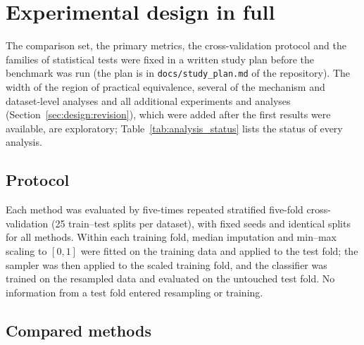 \section{Experimental design in full}\label{sec:design}

The comparison set, the primary metrics, the cross-validation protocol and the families of statistical tests were fixed in a written study plan before the benchmark was run (the plan is in \texttt{docs/study\_plan.md} of the repository). The width of the region of practical equivalence, several of the mechanism and dataset-level analyses and all additional experiments and analyses (Section~\ref{sec:design:revision}), which were added after the first results were available, are exploratory; Table~\ref{tab:analysis_status} lists the status of every analysis.

\subsection{Protocol}\label{sec:design:protocol}

Each method was evaluated by five-times repeated stratified five-fold cross-validation (25 train--test splits per dataset), with fixed seeds and identical splits for all methods. Within each training fold, median imputation and min--max scaling to $[0,1]$ were fitted on the training data and applied to the test fold; the sampler was then applied to the scaled training fold, and the classifier was trained on the resampled data and evaluated on the untouched test fold. No information from a test fold entered resampling or training.

\subsection{Compared methods}\label{sec:design:methods}

